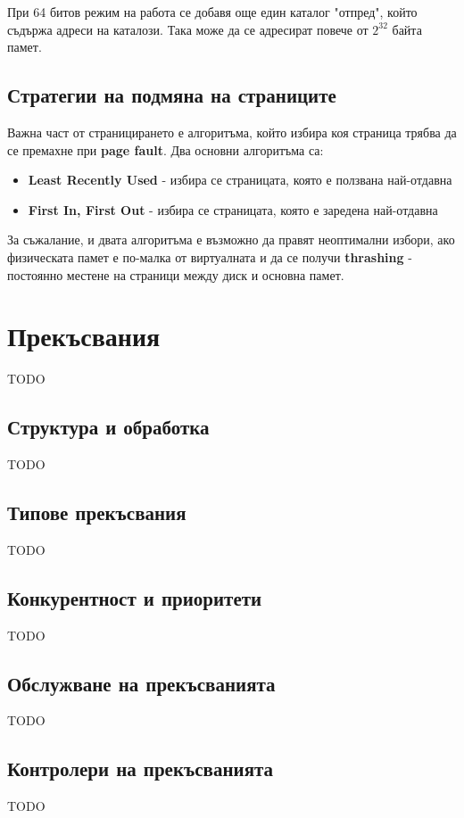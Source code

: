\documentclass[fleqn,12pt]{article}
\begin{document}
При 64 битов режим на работа се добавя още един каталог "отпред", който съдържа адреси на каталози. Така може да се адресират 
повече от $2^32$ байта памет.

\subsection{Стратегии на подмяна на страниците}
Важна част от страницирането е алгоритъма, който избира коя страница трябва да се премахне при \textbf{page fault}.
Два основни алгоритъма са:
\begin{itemize}
    \item \textbf{Least Recently Used} - избира се страницата, която е ползвана най-отдавна
    \item \textbf{First In, First Out} - избира се страницата, която е заредена най-отдавна
\end{itemize}

За съжалание, и двата алгоритъма е възможно да правят неоптимални избори, ако физическата памет е по-малка от виртуалната 
и да се получи \textbf{thrashing} - постоянно местене на страници между диск и основна памет.

\section{Прекъсвания}
TODO

\subsection{Структура и обработка}
TODO

\subsection{Типове прекъсвания}
TODO

\subsection{Конкурентност и приоритети}
TODO

\subsection{Обслужване на прекъсванията}
TODO

\subsection{Контролери на прекъсванията}
TODO
\end{document}
